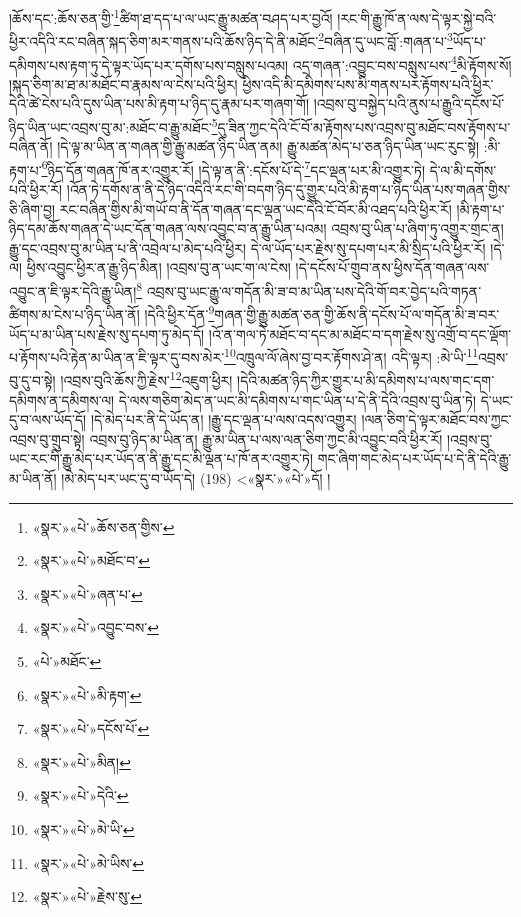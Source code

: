 །ཆོས་དང་:ཆོས་ཅན་གྱི་\footnote{«སྣར་»«པེ་»ཆོས་ཅན་གྱིས་}ཚིག་ཐ་དད་པ་ལ་ཡང་རྒྱུ་མཚན་བཤད་པར་བྱའོ། །རང་གི་རྒྱུ་ཁོ་ན་ལས་དེ་ལྟར་སྐྱེ་བའི་ཕྱིར་འདིའི་རང་བཞིན་སྐད་ཅིག་མར་གནས་པའི་ཆོས་ཉིད་དེ་ནི་མཐོང་\footnote{«སྣར་»«པེ་»མཐོང་བ་}བཞིན་དུ་ཡང་བློ་:གཞན་པ་\footnote{«སྣར་»«པེ་»ཞན་པ་}ཡོད་པ་དམིགས་པས་རྟག་ཏུ་དེ་ལྟར་ཡོད་པར་དགོས་པས་བསླུས་པའམ། འདྲ་གཞན་:འབྱུང་བས་བསླུས་པས་\footnote{«སྣར་»«པེ་»འབྱུང་བས་}མི་རྟོགས་སོ། །སྐད་ཅིག་མ་ཐ་མ་མཐོང་བ་རྣམས་ལ་ངེས་པའི་ཕྱིར། ཕྱིས་འདི་མི་དམིགས་པས་མི་གནས་པར་རྟོགས་པའི་ཕྱིར་དེའི་ཚེ་ངེས་པའི་དུས་ཡིན་པས་མི་རྟག་པ་ཉིད་དུ་རྣམ་པར་གཞག་གོ། །འབྲས་བུ་བསྐྱེད་པའི་ནུས་པ་རྒྱུའི་དངོས་པོ་ཉིད་ཡིན་ཡང་འབྲས་བུ་མ་:མཐོང་བ་རྒྱུ་མཐོང་\footnote{«པེ་»མཐོང་}དུ་ཟིན་ཀྱང་དེའི་ངོ་བོ་མ་རྟོགས་པས་འབྲས་བུ་མཐོང་བས་རྟོགས་པ་བཞིན་ནོ། །དེ་ལྟ་མ་ཡིན་ན་གཞན་གྱི་རྒྱུ་མཚན་ཉིད་ཡིན་ནམ། རྒྱུ་མཚན་མེད་པ་ཅན་ཉིད་ཡིན་ཡང་རུང་སྟེ། :མི་རྟག་པ་\footnote{«སྣར་»«པེ་»མི་རྟག་}ཉིད་དོན་གཞན་ཁོ་ནར་འགྱུར་རོ། །དེ་ལྟ་ན་ནི་:དངོས་པོ་དེ་\footnote{«སྣར་»«པེ་»དངོས་པོ་}དང་ལྡན་པར་མི་འགྱུར་ཏེ། དེ་ལ་མི་དགོས་པའི་ཕྱིར་རོ། །འོན་ཏེ་དགོས་ན་ནི་དེ་ཉིད་འདིའི་རང་གི་བདག་ཉིད་དུ་གྱུར་པའི་མི་རྟག་པ་ཉིད་ཡིན་པས་གཞན་གྱིས་ཅི་ཞིག་བྱ། རང་བཞིན་གྱིས་མི་གཡོ་བ་ནི་དོན་གཞན་དང་ལྡན་ཡང་དེའི་ངོ་བོར་མི་འཐད་པའི་ཕྱིར་རོ། །མི་རྟག་པ་ཉིད་དམ་ཆོས་གཞན་དེ་ཡང་དོན་གཞན་ལས་འབྱུང་བ་ན་རྒྱུ་ཡིན་པའམ། འབྲས་བུ་ཡིན་པ་ཞིག་ཏུ་འགྱུར་གྲང་ན། རྒྱུ་དང་འབྲས་བུ་མ་ཡིན་པ་ནི་འབྲེལ་པ་མེད་པའི་ཕྱིར། དེ་ལ་ཡོད་པར་རྗེས་སུ་དཔག་པར་མི་སྲིད་པའི་ཕྱིར་རོ། །དེ་ལ། ཕྱིས་འབྱུང་ཕྱིར་ན་རྒྱུ་ཉིད་མིན། །འབྲས་བུ་ན་ཡང་ག་ལ་ངེས། །དེ་དངོས་པོ་གྲུབ་ནས་ཕྱིས་དོན་གཞན་ལས་འབྱུང་ན་ཇི་ལྟར་དེའི་རྒྱུ་ཡིན།\footnote{«སྣར་»«པེ་»མིན།} འབྲས་བུ་ཡང་རྒྱུ་ལ་གདོན་མི་ཟ་བ་མ་ཡིན་པས་དེའི་གོ་བར་བྱེད་པའི་གཏན་ཚིགས་མ་ངེས་པ་ཉིད་ཡིན་ནོ། །དེའི་ཕྱིར་དོན་\footnote{«སྣར་»«པེ་»དེའི་}གཞན་གྱི་རྒྱུ་མཚན་ཅན་གྱི་ཆོས་ནི་དངོས་པོ་ལ་གདོན་མི་ཟ་བར་ཡོད་པ་མ་ཡིན་པས་རྗེས་སུ་དཔག་ཏུ་མེད་དོ། །འོ་ན་གལ་ཏེ་མཐོང་བ་དང་མ་མཐོང་བ་དག་རྗེས་སུ་འགྲོ་བ་དང་ལྡོག་པ་རྟོགས་པའི་རྟེན་མ་ཡིན་ན་ཇི་ལྟར་དུ་བས་མེར་\footnote{«སྣར་»«པེ་»མེ་ཡི་}འཁྲུལ་ལོ་ཞེས་བྱ་བར་རྟོགས་ཤེ་ན། འདི་ལྟར། :མེ་ཡི་\footnote{«སྣར་»«པེ་»མེ་ཡིས་}འབྲས་བུ་དུ་བ་སྟེ། །འབྲས་བུའི་ཆོས་ཀྱི་རྗེས་\footnote{«སྣར་»«པེ་»རྗེས་སུ་}འཇུག་ཕྱིར། །དེའི་མཚན་ཉིད་ཀྱིར་གྱུར་པ་མི་དམིགས་པ་ལས་གང་དག་དམིགས་ན་དམིགས་ལ། དེ་ལས་གཅིག་མེད་ན་ཡང་མི་དམིགས་པ་གང་ཡིན་པ་དེ་ནི་དེའི་འབྲས་བུ་ཡིན་ཏེ། དེ་ཡང་དུ་བ་ལས་ཡོད་དོ། །དེ་མེད་པར་ནི་དེ་ཡོད་ན། །རྒྱུ་དང་ལྡན་པ་ལས་འདས་འགྱུར། །ལན་ཅིག་དེ་ལྟར་མཐོང་བས་ཀྱང་འབྲས་བུ་གྲུབ་སྟེ། འབྲས་བུ་ཉིད་མ་ཡིན་ན། རྒྱུ་མ་ཡིན་པ་ལས་ལན་ཅིག་ཀྱང་མི་འབྱུང་བའི་ཕྱིར་རོ། །འབྲས་བུ་ཡང་རང་གི་རྒྱུ་མེད་པར་ཡོད་ན་ནི་རྒྱུ་དང་མི་ལྡན་པ་ཁོ་ནར་འགྱུར་ཏེ། གང་ཞིག་གང་མེད་པར་ཡོད་པ་དེ་ནི་དེའི་རྒྱུ་མ་ཡིན་ནོ། །མེ་མེད་པར་ཡང་དུ་བ་ཡོད་དེ། (198) <«སྣར་»«པེ་»དོ། །
